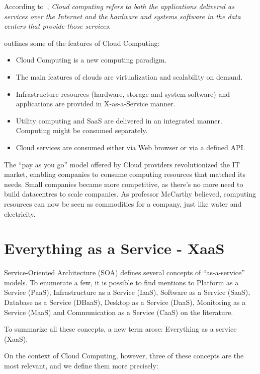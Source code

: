 According to~\cite{AViewOfCloudComputing}, \textit{Cloud computing refers to both the applications delivered as services over the Internet and the hardware and systems software in the data centers that provide those services.} 

\cite{stanoevskaslabeva2009grid} outlines some of the features of Cloud Computing:

\begin{itemize}
   \item{Cloud Computing is a new computing paradigm.}
   \item{The main features of clouds are virtualization and scalability on demand.}

   \item{Infrastructure resources (hardware, storage and system software) and applications
        are provided in X-as-a-Service manner.}
   \item{Utility computing and SaaS are delivered in an integrated manner. Computing might be consumed separately.}
   \item{Cloud services are consumed either via Web browser or via a defined API.}
\end{itemize}


The ``pay as you go'' model offered by Cloud providers revolutionized the IT market, enabling companies to consume computing resources that matched its needs. Small companies became more competitive, as there's no more need to build datacentres to scale companies. As professor McCarthy believed, computing resources can now be seen as commodities for a company, just like water and electricity.  

\section{Everything as a Service - XaaS}

Service-Oriented Architecture (SOA) defines several concepts of ``as-a-service'' models. To enumerate a few, it is possible to find mentions to Platform as a Service (PaaS), Infrastructure as a Service (IaaS), Software as a Service (SaaS), Database as a Service (DBaaS), Desktop as a Service (DaaS), Monitoring as a Service (MaaS) and Communication as a Service (CaaS) on the literature. 

To summarize all these concepts, a new term arose: Everything as a service (XaaS)\cite{7214098}\cite{Armbrust09m.:above}.

On the context of Cloud Computing, however, three of these concepts are the most relevant, and we define them more precisely:

